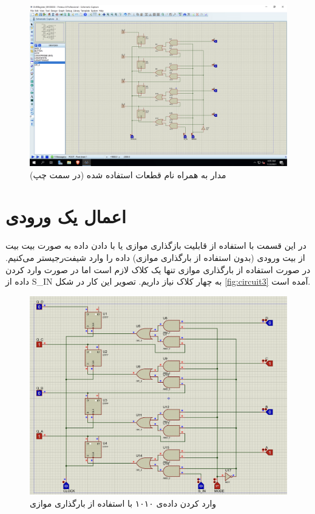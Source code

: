 \begin{figure}
    \centering
    \includegraphics[width=\textwidth]{part1/screen1.png}
    \caption{
    مدار به همراه نام قطعات استفاده شده
    (در سمت چپ)
    }
    \label{fig:circuit2}
\end{figure}

\section{
اعمال یک ورودی
}
در این قسمت با استفاده از قابلیت بازگذاری موازی یا با دادن داده به صورت بیت بیت از بیت ورودی
(بدون استفاده از بارگذاری موازی)
داده را وارد شیفت‌رجیستر می‌کنیم.
در صورت استفاده از بارگذاری موازی تنها یک کلاک لازم است اما در صورت وارد کردن داده از
S\_IN
به چهار کلاک نیاز داریم.
تصویر این کار در شکل
\eqref{fig:circuit3}
آمده است.

\begin{figure}
    \centering
    \includegraphics[width=\textwidth]{part1/circuit2.png}
    \caption{
    وارد کردن داده‌ی ۱۰۱۰ با استفاده از بارگذاری موازی
    }
    \label{fig:circuit3}
\end{figure}

